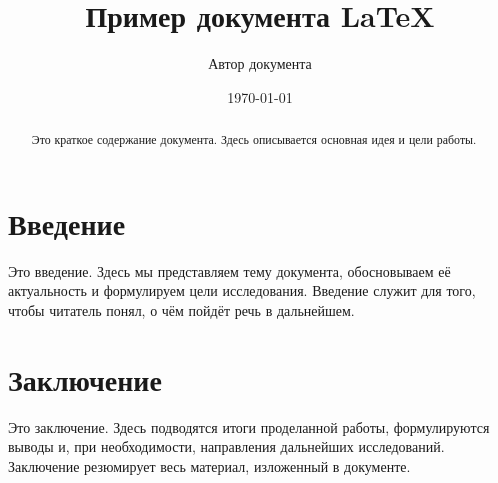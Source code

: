 \documentclass{article}
\title{Пример документа LaTeX}
\author{Автор документа}
\date{\today}
\begin{document}
\maketitle

\begin{abstract}
Это краткое содержание документа. Здесь описывается основная идея и цели работы.
\end{abstract}

\section{Введение}
Это введение. Здесь мы представляем тему документа, обосновываем её актуальность и формулируем цели исследования. Введение служит для того, чтобы читатель понял, о чём пойдёт речь в дальнейшем.

\section{Заключение}
Это заключение. Здесь подводятся итоги проделанной работы, формулируются выводы и, при необходимости, направления дальнейших исследований. Заключение резюмирует весь материал, изложенный в документе.
\end{document}
